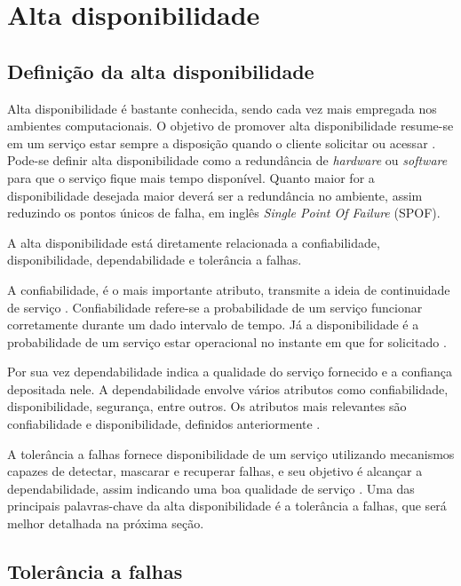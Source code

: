 \chapter{Alta disponibilidade}

\section{Definição da alta disponibilidade}

Alta disponibilidade é bastante conhecida, sendo cada vez mais empregada nos ambientes computacionais.
O objetivo de promover alta disponibilidade resume-se em um serviço estar sempre 
a disposição quando o cliente solicitar ou acessar \cite{costa2009}.
Pode-se definir alta disponibilidade como a redundância de \textit{hardware} ou \textit{software} para que o serviço fique mais tempo disponível.
Quanto maior for a disponibilidade desejada maior deverá ser a redundância no ambiente, assim reduzindo os pontos únicos de falha,
em inglês \textit{Single Point Of Failure} (SPOF).

A alta disponibilidade está diretamente relacionada a confiabilidade, disponibilidade, dependabilidade e tolerância a falhas. 

A confiabilidade, é o mais importante atributo, transmite a ideia de continuidade de serviço \cite{pankaj1994}. Confiabilidade refere-se 
a probabilidade de um serviço funcionar corretamente durante um dado intervalo de tempo. Já a disponibilidade é a probabilidade de um 
serviço estar operacional no instante em que for solicitado \cite{costa2009}.

Por sua vez dependabilidade indica a qualidade do serviço fornecido e a confiança depositada nele. A dependabilidade envolve vários
atributos como confiabilidade, disponibilidade, segurança, entre outros. Os atributos mais relevantes são confiabilidade e disponibilidade,
definidos anteriormente \cite{weber2002}.

A tolerância a falhas fornece disponibilidade de um serviço utilizando mecanismos capazes de detectar, mascarar e recuperar falhas, 
e seu objetivo é alcançar a dependabilidade, assim indicando uma boa qualidade de serviço \cite{costa2009}.
Uma das principais palavras-chave da alta disponibilidade é a tolerância a falhas, que será melhor detalhada na próxima seção.

\section{Tolerância a falhas}

